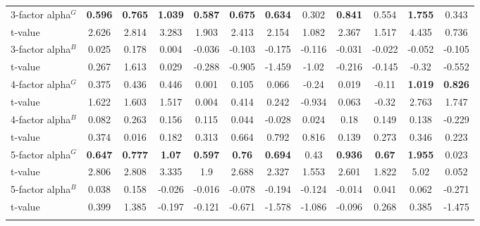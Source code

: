 \documentclass[11pt]{article}
\begin{document}
\begin{appendices}
\begin{table}[!htbp]
{\begin{tabular}{@{\extracolsep{5pt}} lccccccccccc}
			3-factor alpha$^G$ & \textbf{0.596} & \textbf{0.765} & \textbf{1.039} & \textbf{0.587} & \textbf{0.675} & \textbf{0.634} & 0.302 & \textbf{0.841} & 0.554 & \textbf{1.755} & 0.343 \\ 
			t-value & 2.626 & 2.814 & 3.283 & 1.903 & 2.413 & 2.154 & 1.082 & 2.367 & 1.517 & 4.435 & 0.736 \\[2ex] 
			
			3-factor alpha$^B$ & 0.025 & 0.178 & 0.004 & -0.036 & -0.103 & -0.175 & -0.116 & -0.031 & -0.022 & -0.052 & -0.105 \\ 			
			t-value & 0.267 & 1.613 & 0.029 & -0.288 & -0.905 & -1.459 & -1.02 & -0.216 & -0.145 & -0.32 & -0.552 \\[4ex] 
			
			4-factor alpha$^G$ & 0.375 & 0.436 & 0.446 & 0.001 & 0.105 & 0.066 & -0.24 & 0.019 & -0.11 & \textbf{1.019} & \textbf{0.826} \\ 
			t-value & 1.622 & 1.603 & 1.517 & 0.004 & 0.414 & 0.242 & -0.934 & 0.063 & -0.32 & 2.763 & 1.747 \\[2ex] 
			
			4-factor alpha$^B$ & 0.082 & 0.263 & 0.156 & 0.115 & 0.044 & -0.028 & 0.024 & 0.18 & 0.149 & 0.138 & -0.229 \\ 
			t-value & 0.374 & 0.016 & 0.182 & 0.313 & 0.664 & 0.792 & 0.816 & 0.139 & 0.273 & 0.346 & 0.223 \\[4ex] 
			
			5-factor alpha$^G$ & \textbf{0.647} & \textbf{0.777} & \textbf{1.07} & \textbf{0.597} & \textbf{0.76} & \textbf{0.694} & 0.43 & \textbf{0.936} & \textbf{0.67} & \textbf{1.955} & 0.023 \\ 
			t-value & 2.806 & 2.808 & 3.335 & 1.9 & 2.688 & 2.327 & 1.553 & 2.601 & 1.822 & 5.02 & 0.052 \\[2ex] 
			
			5-factor alpha$^B$ & 0.038 & 0.158 & -0.026 & -0.016 & -0.078 & -0.194 & -0.124 & -0.014 & 0.041 & 0.062 & -0.271 \\ 
			t-value & 0.399 & 1.385 & -0.197 & -0.121 & -0.671 & -1.578 & -1.086 & -0.096 & 0.268 & 0.385 & -1.475 \\ 
			\hline \\[-1.8ex] 
	\end{tabular}}
\end{table} 







\end{appendices}
\end{document}
